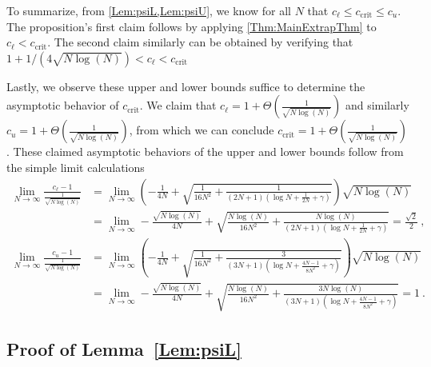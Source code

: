 \documentclass[11pt]{article}
\numberwithin{equation}{section}
\theoremstyle{definition}
\theoremstyle{definition}
\theoremstyle{definition}
\newcommand{\1}{\mathbf{1}}
\newcommand{\cCrit}{c_\mathrm{crit}}
\newcommand{\harmonicUpperBd}{\log N + \frac{1}{2N} + \gamma}
\newcommand{\harmonicLowerBd}{\log N + \frac{4N-1}{8N^2} + \gamma}
\begin{document}
To summarize, from \cref{Lem:psiL,Lem:psiU}, we know for all $N$ that $c_\ell \leq \cCrit \leq c_u$.
The proposition's first claim follows by applying \cref{Thm:MainExtrapThm} to $c_\ell < \cCrit$. The second claim similarly can be obtained by verifying that $1 + 1/(4\sqrt{N \log(N)}) < c_\ell < \cCrit$

Lastly, we observe these upper and lower bounds suffice to determine the asymptotic behavior of $\cCrit$. We claim that $c_\ell = 1 + \Theta\left(\frac{1}{\sqrt{N \log(N)}}\right)$ and similarly $c_u =  1 + \Theta\left(\frac{1}{\sqrt{N \log(N)}}\right)$, from which we can conclude $\cCrit =  1 + \Theta\left(\frac{1}{\sqrt{N \log(N)}}\right)$.
These claimed asymptotic behaviors of the upper and lower bounds follow from the simple limit calculations
\begin{align*}
    \lim_{N\to\infty} \frac{c_\ell-1}{\frac{1}{\sqrt{N\log(N)}}} & = \lim_{N \to \infty} \left(-\frac{1}{4N} + \sqrt{\frac{1}{16N^2}+\frac{1}{(2N+1)(\harmonicUpperBd)}}\right) \sqrt{N \log(N)} \\
    & = \lim_{N\to\infty} - \frac{\sqrt{N \log(N)}}{4N} + \sqrt{\frac{N\log(N)}{16N^2} + \frac{N \log(N)}{(2N+1)(\harmonicUpperBd)}} = \frac{\sqrt{2}}{2} \ , \\
    \lim_{N\to\infty} \frac{c_u-1}{\frac{1}{\sqrt{N\log(N)}}} & = \lim_{N \to \infty} \left(-\frac{1}{4N} + \sqrt{\frac{1}{16N^2}+\frac{3}{(3N+1)(\harmonicLowerBd)}}\right) \sqrt{N \log(N)} \\
    & = \lim_{N\to\infty} - \frac{\sqrt{N \log(N)}}{4N} + \sqrt{\frac{N\log(N)}{16N^2} + \frac{3N \log(N)}{(3N+1)(\harmonicLowerBd)}} = 1 \ .
\end{align*}


\subsection{Proof of Lemma~\ref{Lem:psiL}}
\end{document}

